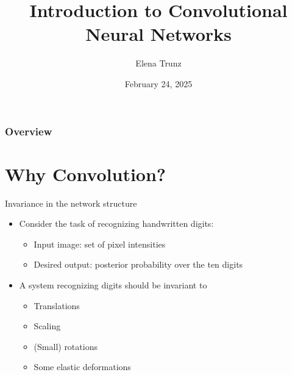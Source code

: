 \documentclass{beamer}
\title{Introduction to Convolutional Neural Networks}
\date{February 24, 2025}%
\institute{Visual Computing Group, University of Bonn}
\author{Elena Trunz}
\begin{document}
    \maketitle

    \begin{frame}
    \frametitle{Overview} 
    \tableofcontents
    \end{frame}

		
		\section{Why Convolution?}
		\begin{frame}{Invariance in the network structure}
	\begin{figure}
        
      \end{figure}
			\begin{itemize}
		\item Consider the task of recognizing handwritten digits:
		\begin{itemize}
			\item Input image: set of pixel intensities
			\item Desired output: posterior probability over the ten digits
		\end{itemize} %
		\item A system recognizing digits should be invariant to
		\begin{itemize}
			\item Translations
			\item Scaling
			\item (Small) rotations
			\item Some elastic deformations
		\end{itemize}
		\end{itemize}
	\end{frame}
\end{document}
